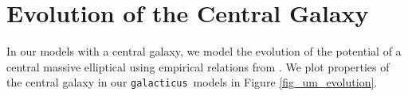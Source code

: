 \documentclass[%
 reprint,
 amsmath,
 amssymb,
 aps,
prd,
twocolumn,
superscriptaddress,
preprintnumbers,
floatfix,
nofootinbib
]{revtex4-2}
\def\gal{{\tt galacticus}~}
\newcommand{\reffig}[1]{Figure \ref{#1}}
\begin{document}

\section{Evolution of the Central Galaxy}\label{sec:appendix}
 In our models with a central galaxy, we model the evolution of the potential of a central massive elliptical using empirical relations from \citet{Behroozi_2019}.
We plot properties of the central galaxy in our \gal models in \reffig{fig_um_evolution}.
\end{document}
